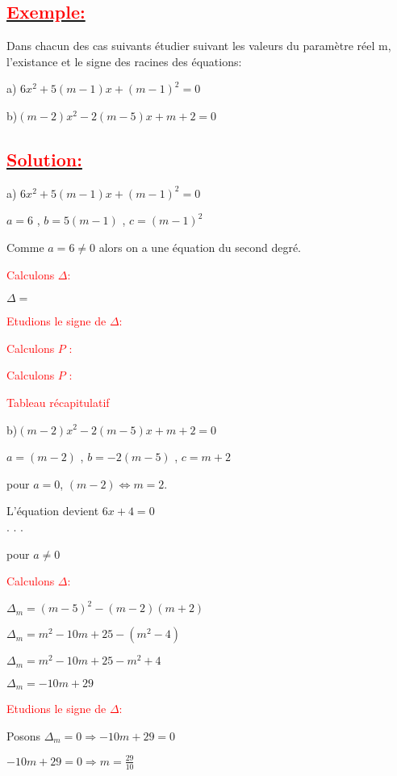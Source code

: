 \documentclass[12pt]{article}
\begin{document}
\subsection*{\underline{\textbf{\textcolor{red}{Exemple:}}}}
Dans chacun des cas suivants étudier suivant les valeurs du paramètre réel m, l'existance et le signe des racines des équations:

a)
$6x^{2}+5(m-1)x+(m-1)^{2}=0$

b)$(m-2)x^{2}-2(m-5)x+m+2=0$
\subsection*{\underline{\textbf{\textcolor{red}{Solution:}}}}
a)
$6x^{2}+5(m-1)x+(m-1)^{2}=0$

$a=6$ , $b=5(m-1)$ , $c=(m-1)^{2}$

Comme $a=6\neq 0$ alors on a une équation du second degré.

\textcolor{red}{Calculons $\Delta$:}

$\Delta=$

\textcolor{red}{Etudions le signe de $\Delta$:}

\textcolor{red}{Calculons $P$ :}

\textcolor{red}{Calculons $P$ :}

\textcolor{red}{Tableau récapitulatif}

b)$(m-2)x^{2}-2(m-5)x+m+2=0$

$a=(m-2)$ , $b=-2(m-5)$ , $c=m+2$

pour $a=0$, $(m-2) \Leftrightarrow m=2$.

L'équation devient $6x+4=0$\\
.
.
.

pour $a\neq 0$

\textcolor{red}{Calculons $\Delta$:}

$\Delta_{m}=(m-5)^{2}-(m-2)(m+2)$

$\Delta_{m}=m^{2}-10m+25-(m^{2}-4)$

$\Delta_{m}=m^{2}-10m+25-m^{2}+4$

$\Delta_{m}=-10m+29$

\textcolor{red}{Etudions le signe de $\Delta$:}

Posons $\Delta_{m}=0 \Rightarrow -10m+29=0$

$-10m+29=0 \Rightarrow m=\frac{29}{10}$
\end{document}
